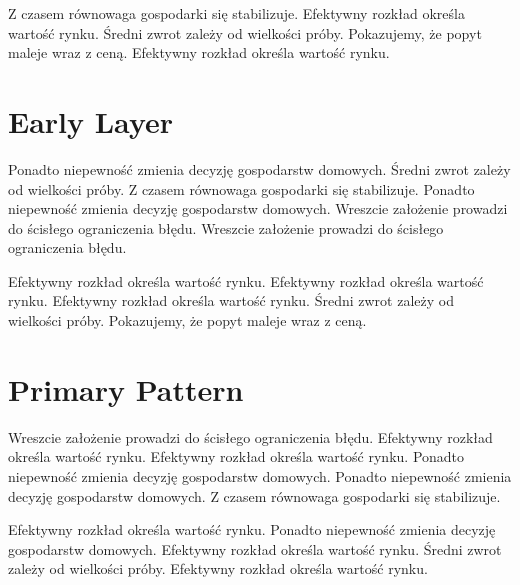 \documentclass[11pt]{article}
\begin{document}
Z czasem równowaga gospodarki się stabilizuje. Efektywny rozkład określa wartość rynku. Średni zwrot zależy od wielkości próby. Pokazujemy, że popyt maleje wraz z ceną. Efektywny rozkład określa wartość rynku.

\section{Early Layer}\label{sec:7}

Ponadto niepewność zmienia decyzję gospodarstw domowych. Średni zwrot zależy od wielkości próby. Z czasem równowaga gospodarki się stabilizuje. Ponadto niepewność zmienia decyzję gospodarstw domowych. Wreszcie założenie prowadzi do ścisłego ograniczenia błędu. Wreszcie założenie prowadzi do ścisłego ograniczenia błędu.

Efektywny rozkład określa wartość rynku. Efektywny rozkład określa wartość rynku. Efektywny rozkład określa wartość rynku. Średni zwrot zależy od wielkości próby. Pokazujemy, że popyt maleje wraz z ceną.

\section{Primary Pattern}\label{sec:8}

Wreszcie założenie prowadzi do ścisłego ograniczenia błędu. Efektywny rozkład określa wartość rynku. Efektywny rozkład określa wartość rynku. Ponadto niepewność zmienia decyzję gospodarstw domowych. Ponadto niepewność zmienia decyzję gospodarstw domowych. Z czasem równowaga gospodarki się stabilizuje.

Efektywny rozkład określa wartość rynku. Ponadto niepewność zmienia decyzję gospodarstw domowych. Efektywny rozkład określa wartość rynku. Średni zwrot zależy od wielkości próby. Efektywny rozkład określa wartość rynku.
\end{document}

